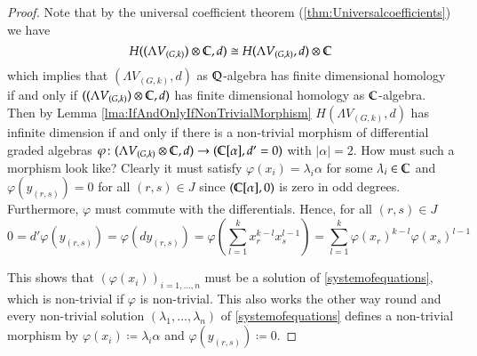 \begin{proof}
 Note that by the universal coefficient theorem (\ref{thm:Universalcoefficients}) we have
 $$ H ((\Lambda V_{(G,k)}) \otimes \mathbb{C}, d) \cong H(\Lambda V_{(G,k)}, d) \otimes \mathbb{C} $$ 
 which implies that $(\Lambda V_{(G,k)}, d)$ as  $\mathbb{Q}$-algebra has finite dimensional homology if and only if
 ${((\Lambda V_{(G,k)}) \otimes \mathbb{C} , d)}$ has finite dimensional homology as $\mathbb{C}$-algebra. Then by
 Lemma \ref{lma:IfAndOnlyIfNonTrivialMorphism} $H(\Lambda V_{(G,k)},d)$  has infinite dimension if and only if 
 there is a non-trivial morphism of differential graded algebras 
 ${\varphi \colon (\Lambda V_{(G,k)} \otimes \mathbb{C},d)  \to ( \mathbb{C} [\alpha] ,d' = 0)}$ with $|\alpha| = 2$. How must such a morphism look like?
 Clearly it must satisfy $\varphi(x_i) = \lambda_i \alpha$ for some $\lambda_i \in \mathbb{C}$ and $\varphi(y_{(r,s)}) = 0$ for all $(r,s) \in J$  since 
 $(\mathbb{C} [\alpha] , 0)$ is zero in odd degrees. Furthermore, $\varphi$ must commute with the differentials. Hence, 
 for all $(r,s) \in J$
 $$ 0 = d' \varphi(y_{(r,s)}) = \varphi(dy_{(r,s)}) = \varphi(\sum_{l = 1}^k x_r^{k -l} x_s^{l - 1})
 = \sum_{l = 1}^k \varphi(x_r)^{k -l} \varphi(x_s)^{l - 1}$$
 
 This shows that $(\varphi(x_i))_{i = 1, \dotsc , n}$ must be a solution of \ref{systemofequations}, which is non-trivial
 if $\varphi$ is non-trivial.
 This also works the other way round and every non-trivial solution  $(\lambda_1 , \dotsc, \lambda_n)$ of \ref{systemofequations}
 defines a non-trivial morphism by $\varphi(x_i) \coloneqq \lambda_i \alpha$ and $\varphi(y_{(r,s)}) \coloneqq 0$.
 \end{proof}

